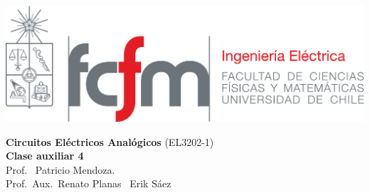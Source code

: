 \documentclass[
  11pt,
  letterpaper,
   addpoints,
   answers
  ]{exam}
\begin{document}
\noindent
\begin{minipage}{0.47\textwidth}
\includegraphics[width=\textwidth]{../fcfm_die}
\end{minipage}
\begin{minipage}{0.53\textwidth}
\begin{center} 
\large\textbf{Circuitos Eléctricos Analógicos} (EL3202-1) \\
\large\textbf{Clase auxiliar 4} \\
\normalsize Prof.~ Patricio Mendoza.\\
\normalsize Prof.~Aux.~Renato Planas ~Erik Sáez
\end{center}
\end{minipage}

\vspace{0.5cm}
\noindent
\vspace{.85cm}
\end{document}
